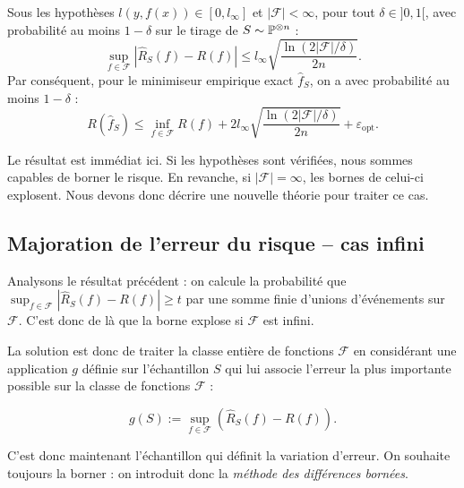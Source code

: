 \begin{theorem}
    Sous les hypothèses $l(y, f(x)) \in [0, l_\infty]$ et $|\mathcal{F}| < \infty$, pour tout $\delta \in ]0, 1[$, avec probabilité au moins $1 - \delta$ sur le tirage de $S \sim \mathbb{P}^{\otimes n}$ :
    \begin{equation}
        \sup_{f \in \mathcal{F}} |\hat{R}_S(f) - R(f)| \leqslant l_\infty \sqrt{\frac{\ln(2|\mathcal{F}|/\delta)}{2n}}.
    \end{equation}
    Par conséquent, pour le minimiseur empirique exact $\hat{f}_S$, on a avec probabilité au moins $1 - \delta$ :
    \begin{equation}
        R(\hat{f}_S) \leqslant \inf_{f \in \mathcal{F}} R(f) + 2 l_\infty \sqrt{\frac{\ln(2|\mathcal{F}|/\delta)}{2n}} + \varepsilon_{\mathrm{opt}}.
    \end{equation}
\end{theorem}

\begin{remark}
    Le résultat est immédiat ici. Si les hypothèses sont vérifiées, nous sommes capables de borner le risque. En revanche, si $| \mathcal{F}| = \infty$, les bornes de celui-ci explosent. Nous devons donc décrire une nouvelle théorie pour traiter ce cas. 
\end{remark}

\subsection{Majoration de l'erreur du risque -- cas infini}

Analysons le résultat précédent : on calcule la probabilité que $ \sup_{f \in \mathcal{F}} |\hat{R}_S(f) - R(f)| \geqslant t $ par une somme finie d'unions d'événements sur $ \mathcal{F}$. C'est donc de là que la borne explose si $ \mathcal{F}$ est infini. 

La solution est donc de traiter la classe entière de fonctions $ \mathcal{F}$ en considérant une application $g$ définie sur l'échantillon $S$ qui lui associe l'erreur la plus importante possible sur la classe de fonctions $ \mathcal{F}$ : 

\begin{equation}
    g(S) := \underset{f \in \mathcal{F}}{\sup} \left( \hat{R}_S(f) - R(f)\right). 
\end{equation}

C'est donc maintenant l'échantillon qui définit la variation d'erreur. On souhaite toujours la borner : on introduit donc la \emph{méthode des différences bornées}. 

